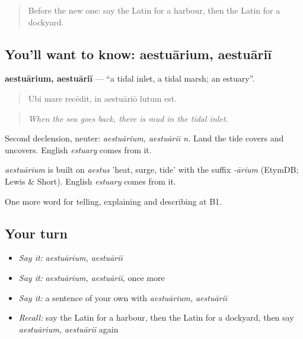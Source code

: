 \label{lesson:LA-C441-aestuarium}



\begin{quote}
Before the new one: say the Latin for a harbour, then the Latin for a dockyard.
\end{quote}

\subsection*{You'll want to know: aestuārium, aestuāriī}
\textbf{aestuārium, aestuāriī} — \textquotedblleft{}a tidal inlet, a tidal marsh; an estuary\textquotedblright{}.

\begin{quote}
Ubi mare recēdit, in aestuāriō lutum est.
\end{quote}

\begin{quote}
\emph{When the sea goes back, there is mud in the tidal inlet.}
\end{quote}

Second declension, neuter: \emph{aestuārium, aestuāriī n.} Land the tide covers and uncovers. English \emph{estuary} comes from it.

\begin{cousinweb}
\emph{aestuārium} is built on \emph{aestus} 'heat, surge, tide' with the suffix \emph{-ārium} (EtymDB; Lewis \& Short). English \emph{estuary} comes from it.
\end{cousinweb}

\begin{grammarlens}[title={What you've built}]
One more word for telling, explaining and describing at B1.
\end{grammarlens}

\subsection*{Your turn}
\begin{itemize}
\raggedright
  \item \emph{Say it:} \emph{aestuārium, aestuāriī}
  \item \emph{Say it:} \emph{aestuārium, aestuāriī}, once more
  \item \emph{Say it:} a sentence of your own with \emph{aestuārium, aestuāriī}
  \item \emph{Recall:} say the Latin for a harbour, then the Latin for a dockyard, then say \emph{aestuārium, aestuāriī} again
\end{itemize}

